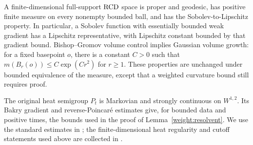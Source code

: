 A finite-dimensional full-support \(\mathrm{RCD}\) space is proper and
geodesic, has positive finite measure on every nonempty bounded
ball, and has the Sobolev-to-Lipschitz property. In particular, a
Sobolev function with essentially bounded weak gradient has a
Lipschitz representative, with Lipschitz constant bounded by that
gradient bound. Bishop--Gromov volume control implies Gaussian
volume growth: for a fixed basepoint \(o\), there is a constant
\(C>0\) such that
\(m(B_r(o))\le C\exp(Cr^2)\) for \(r\ge1\).
These properties are unchanged under bounded equivalence of the
measure, except that a weighted curvature bound still requires proof.

The original heat semigroup \(P_t\) is Markovian and strongly
continuous on \(W^{1,2}\). Its Bakry gradient and
reverse-Poincar\'e estimates give, for bounded data and positive
times, the bounds used in the proof of
Lemma~\ref{weight:resolvent}. We use the standard estimates in
\cite{Savare2014,AGS2015}; the finite-dimensional heat regularity
and cutoff statements used above are collected in
\cite[Appendix~A]{GigliTamanini2021}.
